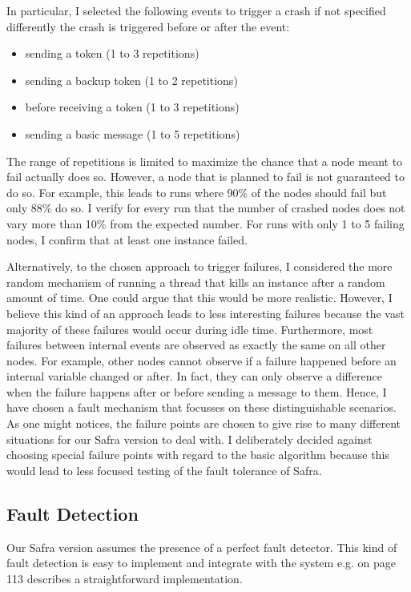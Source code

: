 In particular, I selected the following events to trigger a crash if not specified differently the crash is triggered before or after the event:
\begin{itemize}
	\item sending a token (1 to 3 repetitions)
	\item sending a backup token (1 to 2 repetitions)
	\item before receiving a token (1 to 3 repetitions)
	\item sending a basic message (1 to 5 repetitions)
\end{itemize}
The range of repetitions is limited to maximize the chance that a node meant to fail actually does so. 
However, a node that is planned to fail is not guaranteed to do so.
For example, this leads to runs where 90\% of the nodes should fail but only 88\% do so.
I verify for every run that the number of crashed nodes does not vary more than 10\% from the expected number. For runs with only 1 to 5 failing nodes, I confirm that at least one instance failed.

Alternatively, to the chosen approach to trigger failures, I considered the more random mechanism of running a thread that kills an instance after a random amount of time.
One could argue that this would be more realistic.
However, I believe this kind of an approach leads to less interesting failures because the vast majority of these failures would occur during idle time. 
Furthermore, most failures between internal events are observed as exactly the same on all other nodes. 
For example, other nodes cannot observe if a failure happened before an internal variable changed or after. 
In fact, they can only observe a difference when the failure happens after or before sending a message to them.
Hence, I have chosen a fault mechanism that focusses on these distinguishable scenarios.
As one might notices, the failure points are chosen to give rise to many different situations for our Safra version to deal with. 
I deliberately decided against choosing special failure points with regard to the basic algorithm because this would lead to less focused testing of the fault tolerance of Safra.

\subsection{Fault Detection}
Our Safra version assumes the presence of a perfect fault detector.
This kind of fault detection is easy to implement and integrate with the system e.g.
\cite{Fokkink:2018} on page 113 describes a straightforward implementation.

